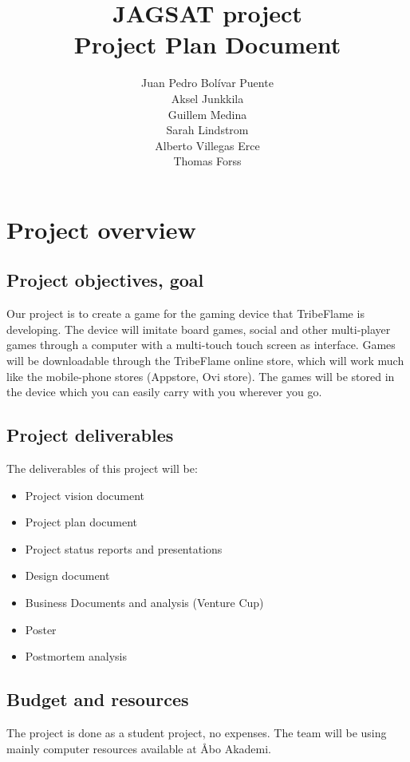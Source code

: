 \documentclass[12pt,a4paper]{article}
\title{\large JAGSAT project\\\huge Project Plan Document}
\author{
  Juan Pedro Bolívar Puente\\ 
  Aksel Junkkila\\
  Guillem Medina\\ 
  Sarah Lindstrom\\ 
  Alberto Villegas Erce\\ 
  Thomas Forss
}
\begin{document}
\maketitle

\tableofcontents
\pagebreak

\section{Project overview}

\subsection{Project objectives, goal}

Our project is to create a game for the gaming device that TribeFlame
is developing. The device will imitate board games, social and other
multi-player games through a computer with a multi-touch touch screen
as interface. Games will be downloadable through the TribeFlame online
store, which will work much like the mobile-phone stores (Appstore,
Ovi store). The games will be stored in the device which you can
easily carry with you wherever you go.

\subsection{Project deliverables}

The deliverables of this project will be:

\begin{itemize}
\item Project vision document
\item Project plan document
\item Project status reports and presentations
\item Design document
\item Business Documents and analysis (Venture Cup)
\item Poster
\item Postmortem analysis
\end{itemize}

\subsection{Budget and resources}

The project is done as a student project, no expenses. The team will
be using mainly computer resources available at Åbo Akademi.
\end{document}
